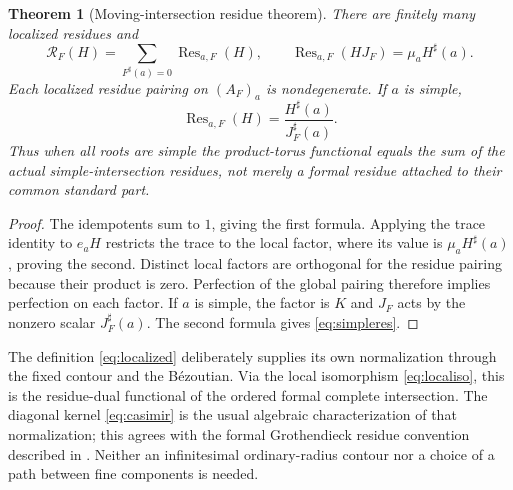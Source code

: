 \documentclass[11pt,letterpaper]{article}
\newtheorem{theorem}{Theorem}[section]
\theoremstyle{definition}
\theoremstyle{remark}
\newcommand{\RR}{\mathscr R}
\newcommand{\sh}{^{\sharp}}
\newcommand{\Res}{\operatorname{Res}}
\numberwithin{equation}{section}
\begin{document}
\begin{theorem}[Moving-intersection residue theorem]\label{thm:localres}
There are finitely many localized residues and
\begin{equation}\label{eq:localres}
 \RR_F(H)=\sum_{F\sh(a)=0}\Res_{a,F}(H),\qquad
 \Res_{a,F}(HJ_F)=\mu_aH\sh(a).
\end{equation}
Each localized residue pairing on $(A_F)_a$ is nondegenerate. If $a$ is simple,
\begin{equation}\label{eq:simpleres}
 \Res_{a,F}(H)=\frac{H\sh(a)}{J_F\sh(a)}.
\end{equation}
Thus when all roots are simple the product-torus functional equals the sum of the actual simple-intersection residues, not merely a formal residue attached to their common standard part.
\end{theorem}
\begin{proof}
The idempotents sum to $1$, giving the first formula. Applying the trace identity to $e_aH$ restricts the trace to the local factor, where its value is $\mu_aH\sh(a)$, proving the second. Distinct local factors are orthogonal for the residue pairing because their product is zero. Perfection of the global pairing therefore implies perfection on each factor. If $a$ is simple, the factor is $K$ and $J_F$ acts by the nonzero scalar $J_F\sh(a)$. The second formula gives \eqref{eq:simpleres}.
\end{proof}

The definition \eqref{eq:localized} deliberately supplies its own normalization through the fixed contour and the B\'ezoutian. Via the local isomorphism \eqref{eq:localiso}, this is the residue-dual functional of the ordered formal complete intersection. The diagonal kernel \eqref{eq:casimir} is the usual algebraic characterization of that normalization; this agrees with the formal Grothendieck residue convention described in \cite[\S0]{CDS}. Neither an infinitesimal ordinary-radius contour nor a choice of a path between fine components is needed.
\end{document}
